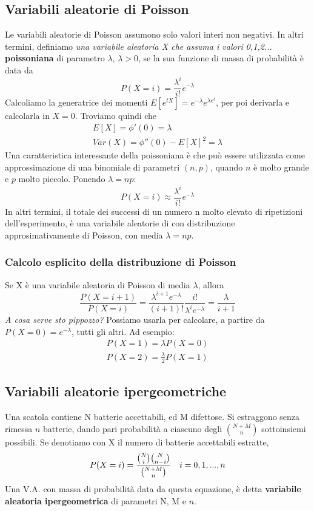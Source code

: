 \documentclass[11pt]{article}
\begin{document}
\subsection{Variabili aleatorie di Poisson}
Le variabili aleatorie di Poisson assumono solo valori interi non negativi.
In altri termini, definiamo \textit{una variabile aleatoria X che assuma i valori 0,1,2...} \textbf{poissoniana} di parametro $\lambda$, $\lambda>0$, se la sua funzione di massa di probabilità è data da
\begin{displaymath}
    P(X=i) = \frac{\lambda^i}{i!}e^{-\lambda}
\end{displaymath}
Calcoliamo la generatrice dei momenti $E[e^{tX}] = e^{-\lambda}e^{\lambda e^t}$, per poi derivarla e calcolarla in $X=0$.
Troviamo quindi che 
\begin{gather*}
    E[X] = \phi'(0) = \lambda\\
    Var(X) = \phi''(0)-E[X]^2 = \lambda
\end{gather*}
Una caratteristica interessante della poissoniana è che può essere utilizzata come approssimazione di una binomiale di parametri $(n,p)$, quando $n$ è molto grande e $p$ molto piccolo. 
Ponendo $\lambda=np$:
\begin{displaymath}
    P(X=i) \approx \frac{\lambda^i}{i!}e^{-\lambda}
\end{displaymath}
In altri termini, il totale dei successi di un numero n molto elevato di ripetizioni dell'esperimento, è una variabile aleatorie di con distribuzione approsimativamente di Poisson, con media $\lambda=np$.
\subsubsection{Calcolo esplicito della distribuzione di Poisson}
Se X è una variabile aleatoria di Poisson di media $\lambda$, allora
\begin{displaymath}
    \frac{P(X=i+1)}{P(X=i)}=\frac{\lambda^{i+1}e^{-\lambda}}{(i+1)!}\frac{i!}{\lambda^i e^{-\lambda}}=\frac{\lambda}{i+1}
\end{displaymath}
\textit{A cosa serve sto pippozzo? }Possiamo usarla per calcolare, a partire da $P(X=0) = e^{-\lambda}$, tutti gli altri. Ad esempio:
\begin{gather*}
    P(X=1) = \lambda P(X=0)\\
    P(X=2) = \frac{\lambda}{2} P(X=1)
\end{gather*}
\subsection{Variabili aleatorie ipergeometriche}
Una scatola contiene N batterie accettabili, ed M difettose. Si estraggono senza rimessa $n$ batterie, dando pari probabilità a ciascuno degli ${{N+M} \choose n}$ sottoinsiemi possibili. Se denotiamo con X il numero di batterie accettabili estratte,
\begin{displaymath}
    P(X=i)=\frac{{N \choose i} {N \choose {n-i}}}{{{N+M} \choose n}}\hspace{10px}i=0,1,...,n
\end{displaymath}
Una V.A. con massa di probabilità data da questa equazione, è detta \textbf{variabile aleatoria ipergeometrica} di parametri N, M e $n$.
\end{document}

